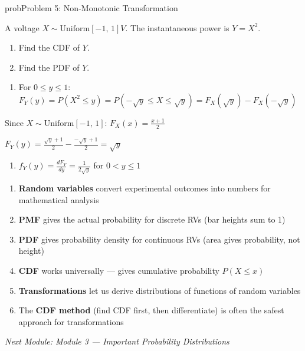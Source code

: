 \begin{PSbox}[unbreakable]{prob}{Problem 5: Non-Monotonic Transformation}

A voltage $X \sim \mathrm{Uniform}[-1,\, 1] V$. The instantaneous power is $Y = X^{2}$.

\begin{enumerate}
\def\labelenumi{(\alph{enumi})}
\tightlist
\item
  Find the CDF of $Y$.
\item
  Find the PDF of $Y$.
\end{enumerate}

\PSsolution{} 

\begin{enumerate}
\def\labelenumi{(\alph{enumi})}
\tightlist
\item
  For $0 \le y \le 1$:\PSbr{}$F_{Y}(y) = P(X^{2} \le y) = P\left(-\sqrt{y} \le X \le \sqrt{y}\right) = F_{X}\left(\sqrt{y}\right) - F_{X}\left(-\sqrt{y}\right)$
\end{enumerate}

Since $X \sim \mathrm{Uniform}[-1,\,1]$: $F_{X}(x) = \frac{x+1}{2}$

$\displaystyle F_{Y}(y) = \frac{\sqrt{y} + 1}{2} - \frac{-\sqrt{y} + 1}{2} = \sqrt{y}$

\begin{enumerate}
\def\labelenumi{(\alph{enumi})}
\setcounter{enumi}{1}
\item
  $f_{Y}(y) = \frac{dF_{Y}}{dy} = \frac{1}{2\sqrt{y}}$ for $0 < y \le 1$
\end{enumerate}

\end{PSbox}


\begin{enumerate}
\def\labelenumi{\arabic{enumi}.}
\tightlist
\item
  \textbf{Random variables} convert experimental outcomes into numbers for mathematical analysis
\item
  \textbf{PMF} gives the actual probability for discrete RVs (bar heights sum to 1)
\item
  \textbf{PDF} gives probability density for continuous RVs (area gives probability, not height)
\item
  \textbf{CDF} works universally — gives cumulative probability $P(X \le x)$
\item
  \textbf{Transformations} let us derive distributions of functions of random variables
\item
  The \textbf{CDF method} (find CDF first, then differentiate) is often the safest approach for transformations
\end{enumerate}

\emph{Next Module: {Module 3 — Important Probability Distributions}}
